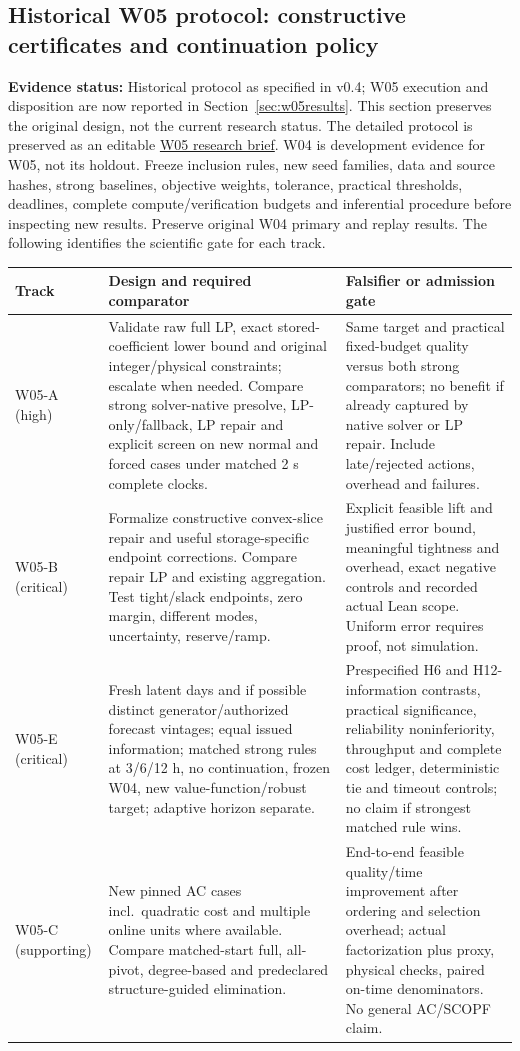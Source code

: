 \documentclass[11pt,letterpaper]{article}
\newcommand{\status}[1]{\textbf{Evidence status:} #1}
\begin{document}
\subsection{Historical W05 protocol: constructive certificates and continuation policy}
\label{sec:w05}
\status{Historical protocol as specified in v0.4; W05 execution and disposition are now reported in Section~\ref{sec:w05results}. This section preserves the original design, not the current research status.}
The detailed protocol is preserved as an editable \href{https://chatgpt.com/space/page_bf81339983a48191928bd72248e6a67a}{W05 research brief}. W04 is development evidence for W05, not its holdout. Freeze inclusion rules, new seed families, data and source hashes, strong baselines, objective weights, tolerance, practical thresholds, deadlines, complete compute/verification budgets and inferential procedure before inspecting new results. Preserve original W04 primary and replay results. The following identifies the scientific gate for each track.

\begin{longtable}{P{.15\linewidth}P{.42\linewidth}P{.34\linewidth}}
\toprule Track & Design and required comparator & Falsifier or admission gate\\\midrule\endhead
W05-A (high) & Validate raw full LP, exact stored-coefficient lower bound and original integer/physical constraints; escalate when needed. Compare strong solver-native presolve, LP-only/fallback, LP repair and explicit screen on new normal and forced cases under matched 2 s complete clocks. & Same target and practical fixed-budget quality versus both strong comparators; no benefit if already captured by native solver or LP repair. Include late/rejected actions, overhead and failures.\\
W05-B (critical) & Formalize constructive convex-slice repair and useful storage-specific endpoint corrections. Compare repair LP and existing aggregation. Test tight/slack endpoints, zero margin, different modes, uncertainty, reserve/ramp. & Explicit feasible lift and justified error bound, meaningful tightness and overhead, exact negative controls and recorded actual Lean scope. Uniform error requires proof, not simulation.\\
W05-E (critical) & Fresh latent days and if possible distinct generator/authorized forecast vintages; equal issued information; matched strong rules at 3/6/12 h, no continuation, frozen W04, new value-function/robust target; adaptive horizon separate. & Prespecified H6 and H12-information contrasts, practical significance, reliability noninferiority, throughput and complete cost ledger, deterministic tie and timeout controls; no claim if strongest matched rule wins.\\
W05-C (supporting) & New pinned AC cases incl.\ quadratic cost and multiple online units where available. Compare matched-start full, all-pivot, degree-based and predeclared structure-guided elimination. & End-to-end feasible quality/time improvement after ordering and selection overhead; actual factorization plus proxy, physical checks, paired on-time denominators. No general AC/SCOPF claim.\\
\bottomrule
\end{longtable}
\end{document}
